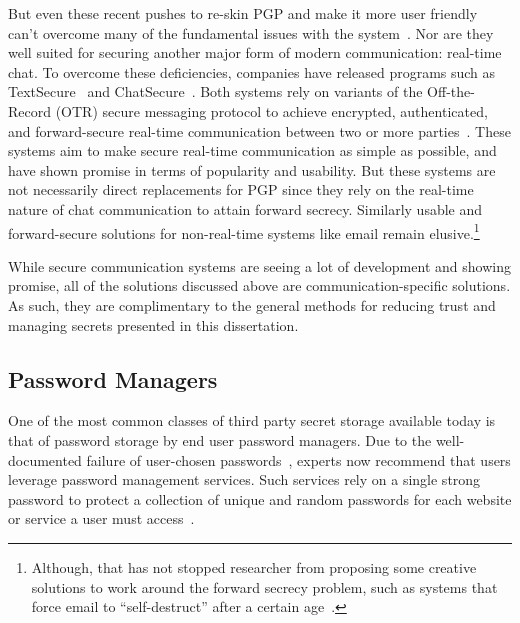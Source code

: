 But even these recent pushes to re-skin PGP and make it more user
friendly can't overcome many of the fundamental issues with the
system~\cite{green-pgp}. Nor are they well suited for securing another
major form of modern communication: real-time chat. To overcome these
deficiencies, companies have released programs such as
TextSecure~\cite{openwhisper} and ChatSecure~\cite{chatsecure}. Both
systems rely on variants of the Off-the-Record (OTR) secure messaging
protocol to achieve encrypted, authenticated, and forward-secure
real-time communication between two or more parties~\cite{otr-v3,
  borisov2004, goldberg2009}. These systems aim to make secure
real-time communication as simple as possible, and have shown promise
in terms of popularity and usability. But these systems are not
necessarily direct replacements for PGP since they rely on the
real-time nature of chat communication to attain forward
secrecy. Similarly usable and forward-secure solutions for
non-real-time systems like email remain elusive.\footnote{Although,
  that has not stopped researcher from proposing some creative
  solutions to work around the forward secrecy problem, such as
  systems that force email to ``self-destruct'' after a certain
  age~\cite{geambasu2009}.}

While secure communication systems are seeing a lot of development and
showing promise, all of the solutions discussed above are
communication-specific solutions. As such, they are complimentary to
the general methods for reducing trust and managing secrets presented
in this dissertation.

\subsection{Password Managers}

One of the most common classes of third party secret storage available
today is that of password storage by end user password managers. Due
to the well-documented failure of user-chosen
passwords~\cite{mazurek2013, goodin-bible, goodin-passwords,
  singer2013}, experts now recommend that users leverage password
management services. Such services rely on a single strong password to
protect a collection of unique and random passwords for each website
or service a user must access~\cite{schneier-passwords,
  krebs-passwords, brodkin-passman}.

